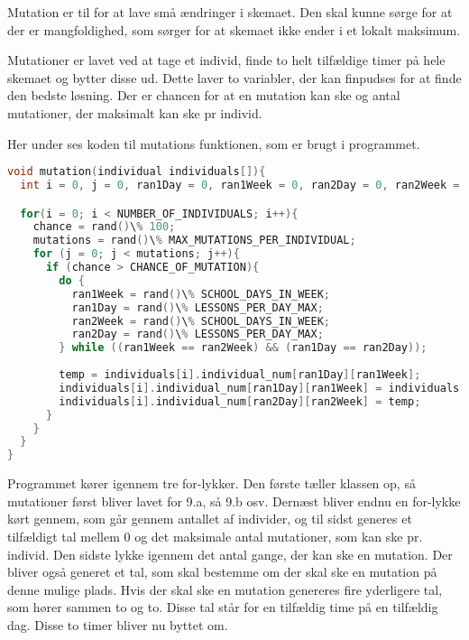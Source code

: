 Mutation er til for at lave små ændringer i skemaet. Den skal kunne sørge for at der er mangfoldighed, som sørger for at skemaet ikke ender i et lokalt maksimum. %

Mutationer er lavet ved at tage et individ, finde to helt tilfældige timer på hele skemaet og bytter disse ud. Dette laver to variabler, der kan finpudses for at finde den bedste løsning. %
Der er chancen for at en mutation kan ske og antal mutationer, der maksimalt kan ske pr individ. %

Her under ses koden til mutations funktionen, som er brugt i programmet.

\begin{lstlisting}[language = C]
void mutation(individual individuals[]){
  int i = 0, j = 0, ran1Day = 0, ran1Week = 0, ran2Day = 0, ran2Week = 0, chance = 0, mutations = 0, temp = 0;

  for(i = 0; i < NUMBER_OF_INDIVIDUALS; i++){
    chance = rand()\% 100;
    mutations = rand()\% MAX_MUTATIONS_PER_INDIVIDUAL;
    for (j = 0; j < mutations; j++){
      if (chance > CHANCE_OF_MUTATION){
        do {
          ran1Week = rand()\% SCHOOL_DAYS_IN_WEEK;
          ran1Day = rand()\% LESSONS_PER_DAY_MAX;
          ran2Week = rand()\% SCHOOL_DAYS_IN_WEEK;
          ran2Day = rand()\% LESSONS_PER_DAY_MAX;
        } while ((ran1Week == ran2Week) && (ran1Day == ran2Day));
        
        temp = individuals[i].individual_num[ran1Day][ran1Week];
        individuals[i].individual_num[ran1Day][ran1Week] = individuals[i].individual_num[ran2Day][ran2Week];
        individuals[i].individual_num[ran2Day][ran2Week] = temp;
      }
    }
  }
}
\end{lstlisting}

Programmet kører igennem tre for-lykker. Den første tæller klassen op, så mutationer først bliver lavet for 9.a, så 9.b osv. Dernæst bliver endnu en for-lykke kørt gennem, som går gennem antallet af individer, og til sidst generes et tilfældigt tal mellem 0 og det maksimale antal mutationer, som kan ske pr. individ. Den sidste lykke igennem det antal gange, der kan ske en mutation. Der bliver også generet et tal, som skal bestemme om der skal ske en mutation på denne mulige plads. Hvis der skal ske en mutation genereres fire yderligere tal, som hører sammen to og to. Disse tal står for en tilfældig time på en tilfældig dag. Disse to timer bliver nu byttet om. 
